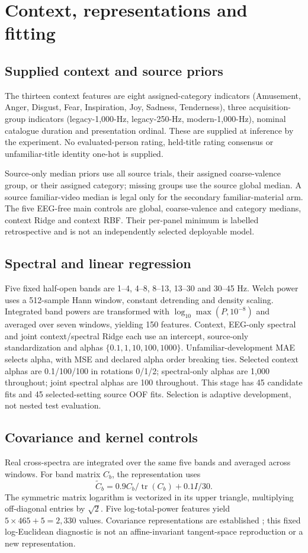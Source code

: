 \documentclass[11pt,a4paper]{article}
\begin{document}
\section{Context, representations and fitting}
\subsection{Supplied context and source priors}
The thirteen context features are eight assigned-category indicators (Amusement, Anger, Disgust, Fear, Inspiration, Joy, Sadness, Tenderness), three acquisition-group indicators (legacy-1,000-Hz, legacy-250-Hz, modern-1,000-Hz), nominal catalogue duration and presentation ordinal. These are supplied at inference by the experiment. No evaluated-person rating, held-title rating consensus or unfamiliar-title identity one-hot is supplied.

Source-only median priors use all source trials, their assigned coarse-valence group, or their assigned category; missing groups use the source global median. A source familiar-video median is legal only for the secondary familiar-material arm. The five EEG-free main controls are global, coarse-valence and category medians, context Ridge and context RBF. Their per-panel minimum is labelled retrospective and is not an independently selected deployable model.

\subsection{Spectral and linear regression}
Five fixed half-open bands are 1--4, 4--8, 8--13, 13--30 and 30--45 Hz. Welch power uses a 512-sample Hann window, constant detrending and density scaling. Integrated band powers are transformed with \(\log_{10}\max(P,10^{-8})\) and averaged over seven windows, yielding 150 features. Context, EEG-only spectral and joint context/spectral Ridge each use an intercept, source-only standardization and alphas \(\{0.1,1,10,100,1000\}\). Unfamiliar-development MAE selects alpha, with MSE and declared alpha order breaking ties. Selected context alphas are 0.1/100/100 in rotations 0/1/2; spectral-only alphas are 1,000 throughout; joint spectral alphas are 100 throughout. This stage has 45 candidate fits and 45 selected-setting source OOF fits. Selection is adaptive development, not nested test evaluation.

\subsection{Covariance and kernel controls}
Real cross-spectra are integrated over the same five bands and averaged across windows. For band matrix \(C_b\), the representation uses
\[
\widetilde C_b=0.9C_b/\operatorname{tr}(C_b)+0.1I/30.
\]
The symmetric matrix logarithm is vectorized in its upper triangle, multiplying off-diagonal entries by \(\sqrt{2}\). Five log-total-power features yield \(5\times465+5=2{,}330\) values. Covariance representations are established \cite{zhang2023spatiotemporal}; this fixed log-Euclidean diagnostic is not an affine-invariant tangent-space reproduction or a new representation.
\end{document}
